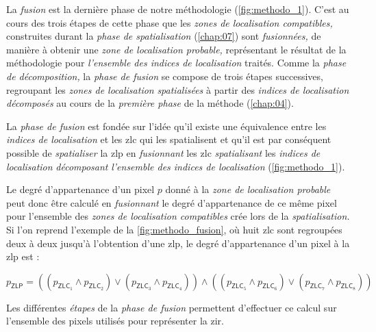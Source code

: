 La \emph{fusion} est la dernière phase de notre méthodologie
(\autoref{fig:methodo_1}). C'est au cours des trois étapes de cette
phase que les \emph{zones de localisation compatibles,} construites
durant la \emph{phase de spatialisation} (\autoref{chap:07}) sont
\emph{fusionnées,} de manière à obtenir une \emph{zone de localisation
  probable,} représentant le résultat de la méthodologie pour
\emph{l'ensemble des indices de localisation} traités. Comme la
\emph{phase de décomposition,} la \emph{phase de fusion} se compose de
trois étapes successives, regroupant les \emph{zones de localisation}
\emph{spatialisées} à partir des \emph{indices de localisation}
\emph{décomposés} au cours de la \emph{première phase} de la méthode
(\autoref{chap:04}).

La \emph{phase de fusion} est fondée sur l'idée qu'il existe une
équivalence entre les \emph{indices de localisation} et les \ac{zlc}
qui les spatialisent et qu'il est par conséquent possible de
\emph{spatialiser} la \ac{zlp} en \emph{fusionnant} les \ac{zlc}
\emph{spatialisant} les \emph{indices de localisation}
\emph{décomposant} \emph{l'ensemble des indices de localisation}
(\autoref{fig:methodo_1}).




Le degré d'appartenance d'un pixel $p$ donné à la \emph{zone de
  localisation probable} peut donc être calculé en \emph{fusionnant}
le degré d'appartenance de ce même pixel pour l'ensemble des
\emph{zones de localisation compatibles} crée lors de la
\emph{spatialisation.} Si l'on reprend l'exemple de la
\autoref{fig:methodo_fusion}, où huit \ac{zlc} sont regroupées deux à
deux jusqu'à l'obtention d'une \ac{zlp}, le degré d'appartenance d'un
pixel à la \ac{zlp} est :

\begin{equation}
 p_{\mathsf{ZLP}} = \left((p_{\mathsf{ZLC}_1} \wedge
p_{\mathsf{ZLC}_2}) \vee (p_{\mathsf{ZLC}_3} \wedge
p_{\mathsf{ZLC}_4})\right) \wedge \left((p_{\mathsf{ZLC}_5} \wedge
p_{\mathsf{ZLC}_6}) \vee (p_{\mathsf{ZLC}_7} \wedge
p_{\mathsf{ZLC}_8})\right)
\end{equation}

Les différentes \emph{étapes} de la \emph{phase de fusion} permettent
d'effectuer ce calcul sur l'ensemble des pixels utilisés pour
représenter la \ac{zir}.




